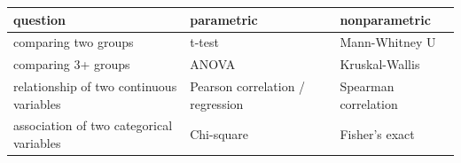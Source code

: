 \begin{table}[ht]
\centering
\begingroup\footnotesize
\begin{tabular}{lll}
  \toprule
question & parametric & nonparametric \\ 
  \midrule
comparing two groups & t-test & Mann-Whitney U \\ 
  comparing 3+ groups & ANOVA & Kruskal-Wallis \\ 
  relationship of two continuous variables & Pearson correlation / regression & Spearman correlation \\ 
  association of two categorical variables & Chi-square & Fisher's exact \\ 
   \bottomrule
\end{tabular}
\endgroup
\end{table}
